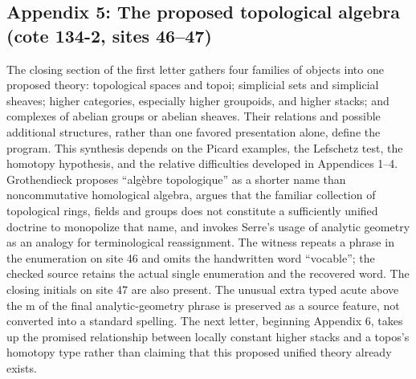 \documentclass[10pt,oneside]{book}
\begin{document}
\subsection*{Appendix 5: The proposed topological algebra (cote 134-2, sites 46--47)}
The closing section of the first letter gathers four families of objects into one proposed theory: topological spaces and topoi; simplicial sets and simplicial sheaves; higher categories, especially higher groupoids, and higher stacks; and complexes of abelian groups or abelian sheaves. Their relations and possible additional structures, rather than one favored presentation alone, define the program. This synthesis depends on the Picard examples, the Lefschetz test, the homotopy hypothesis, and the relative difficulties developed in Appendices 1--4. Grothendieck proposes ``algèbre topologique'' as a shorter name than noncommutative homological algebra, argues that the familiar collection of topological rings, fields and groups does not constitute a sufficiently unified doctrine to monopolize that name, and invokes Serre's usage of analytic geometry as an analogy for terminological reassignment. The witness repeats a phrase in the enumeration on site 46 and omits the handwritten word ``vocable''; the checked source retains the actual single enumeration and the recovered word. The closing initials on site 47 are also present. The unusual extra typed acute above the m of the final analytic-geometry phrase is preserved as a source feature, not converted into a standard spelling. The next letter, beginning Appendix 6, takes up the promised relationship between locally constant higher stacks and a topos's homotopy type rather than claiming that this proposed unified theory already exists.
\end{document}
